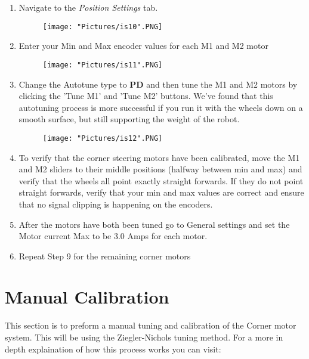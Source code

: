 \documentclass[12pt]{article}
\begin{document}
\begin{enumerate}
\begin{enumerate}
		\item Navigate to the \textit{Position Settings} tab. 

		\begin{figure}[H]
	 		\centering
			\texttt{[image: "Pictures/is10".PNG]}
	 		\caption{}
		\end{figure}
		
		\item Enter your Min and Max encoder values for each M1 and M2 motor

		\begin{figure}[H]
	 		\centering
			\texttt{[image: "Pictures/is11".PNG]}
	 		\caption{}
		\end{figure}	

		\item Change the Autotune type to \textbf{PD} and then tune the M1 and M2 motors by clicking the 'Tune M1' and 'Tune M2' buttons. We've found that this autotuning process is more successful if you run it with the wheels down on a smooth surface, but still supporting the weight of the robot. 

		\begin{figure}[H]
	 		\centering
			\texttt{[image: "Pictures/is12".PNG]}
	 		\caption{}
		\end{figure}	

		\item To verify that the corner steering motors have been calibrated, move the M1 and M2 sliders to their middle positions (halfway between min and max) and verify that the wheels all point exactly straight forwards. If they do not point straight forwards, verify that your min and max values are correct and ensure that no signal clipping is happening on the encoders.
		\item After the motors have both been tuned go to General settings and set the Motor current Max to be 3.0 Amps for each motor. 
		\item Repeat Step 9 for the remaining corner motors
	\end{enumerate}

\end{enumerate} 


\section{Manual Calibration}
\label{manual_calibration}

This section is to preform a manual tuning and calibration of the  Corner motor system. This will be using the Ziegler-Nichols tuning method. For a more in depth explaination of how this process works you can visit:
\end{document}
